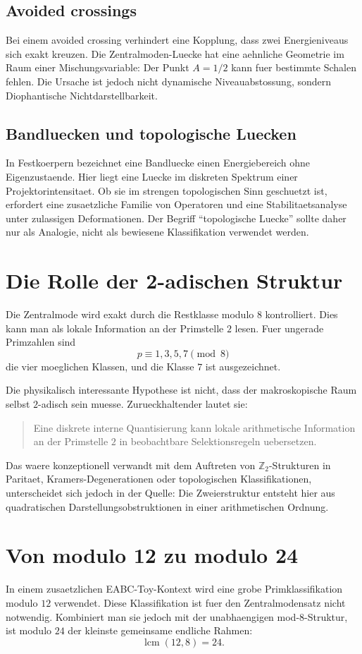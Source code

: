 \documentclass[11pt,a4paper]{article}
\theoremstyle{definition}
\begin{document}
\subsection{Avoided crossings}
Bei einem avoided crossing verhindert eine Kopplung, dass zwei Energieniveaus sich exakt kreuzen. Die Zentralmoden-Luecke hat eine aehnliche Geometrie im Raum einer Mischungsvariable: Der Punkt $A=1/2$ kann fuer bestimmte Schalen fehlen. Die Ursache ist jedoch nicht dynamische Niveauabstossung, sondern Diophantische Nichtdarstellbarkeit.

\subsection{Bandluecken und topologische Luecken}
In Festkoerpern bezeichnet eine Bandluecke einen Energiebereich ohne Eigenzustaende. Hier liegt eine Luecke im diskreten Spektrum einer Projektorintensitaet. Ob sie im strengen topologischen Sinn geschuetzt ist, erfordert eine zusaetzliche Familie von Operatoren und eine Stabilitaetsanalyse unter zulassigen Deformationen. Der Begriff \enquote{topologische Luecke} sollte daher nur als Analogie, nicht als bewiesene Klassifikation verwendet werden.

\section{Die Rolle der 2-adischen Struktur}
Die Zentralmode wird exakt durch die Restklasse modulo $8$ kontrolliert. Dies kann man als lokale Information an der Primstelle $2$ lesen. Fuer ungerade Primzahlen sind
\[
p\equiv1,3,5,7\pmod8
\]
die vier moeglichen Klassen, und die Klasse $7$ ist ausgezeichnet.

Die physikalisch interessante Hypothese ist nicht, dass der makroskopische Raum selbst $2$-adisch sein muesse. Zurueckhaltender lautet sie:
\begin{quote}
Eine diskrete interne Quantisierung kann lokale arithmetische Information an der Primstelle $2$ in beobachtbare Selektionsregeln uebersetzen.
\end{quote}

Das waere konzeptionell verwandt mit dem Auftreten von $\mathbb Z_2$-Strukturen in Paritaet, Kramers-Degenerationen oder topologischen Klassifikationen, unterscheidet sich jedoch in der Quelle: Die Zweierstruktur entsteht hier aus quadratischen Darstellungsobstruktionen in einer arithmetischen Ordnung.

\section{Von modulo 12 zu modulo 24}
In einem zusaetzlichen EABC-Toy-Kontext wird eine grobe Primklassifikation modulo $12$ verwendet. Diese Klassifikation ist fuer den Zentralmodensatz nicht notwendig. Kombiniert man sie jedoch mit der unabhaengigen mod-8-Struktur, ist modulo $24$ der kleinste gemeinsame endliche Rahmen:
\[
\operatorname{lcm}(12,8)=24.
\]
\end{document}
